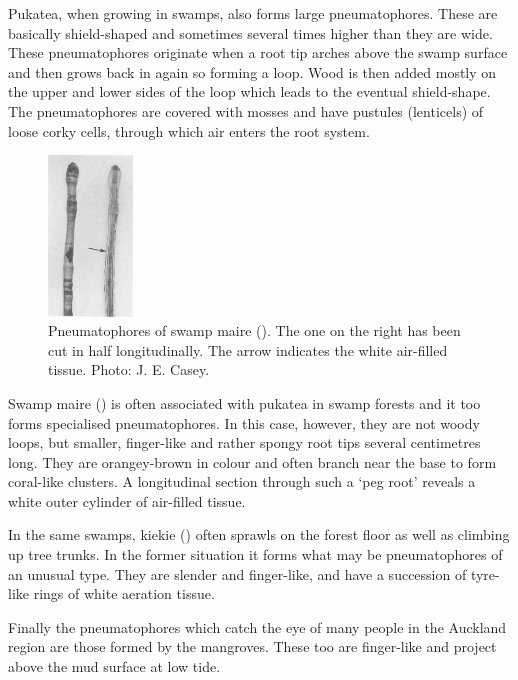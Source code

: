 Pukatea, when growing in swamps, also forms large pneumatophores.
These are basically shield-shaped and sometimes several times higher than they are wide.
These pneumatophores originate when a root tip arches above the swamp surface and then grows back in again so forming a loop.
Wood is then added mostly on the upper and lower sides of the loop which leads to the eventual shield-shape.
The pneumatophores are covered with mosses and have pustules (lenticels) of loose corky cells, through which air enters the root system.

\begin{figure}
	\includegraphics[width=0.2\textwidth]{graphics/figure12swampmaire.jpg}
	\centering
	\caption[Pneumatophores of swamp maire]{Pneumatophores of swamp maire ().
	The one on the right has been cut in half longitudinally.
	The arrow indicates the white air-filled tissue.
	Photo:  J. E. Casey.}%
	\label{fig:12swampmaire}
\end{figure}

Swamp maire () is often associated with pukatea in swamp forests and it too forms specialised pneumatophores.
In this case, however, they are not woody loops, but smaller, finger-like and rather spongy root tips several centimetres long.
They are orangey-brown in colour and often branch near the base to form coral-like clusters.
A longitudinal section through such a `peg root' reveals a white outer cylinder of air-filled tissue.

In the same swamps, kiekie () often sprawls on the forest floor as well as climbing up tree trunks.
In the former situation it forms what may be pneumatophores of an unusual type.
They are slender and finger-like, and have a succession of tyre-like rings of white aeration tissue.

Finally the pneumatophores which catch the eye of many people in the Auckland region are those formed by the mangroves.
These too are finger-like and project above the mud surface at low tide.

